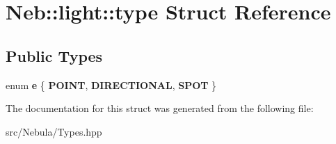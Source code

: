 \hypertarget{structNeb_1_1light_1_1type}{\section{\-Neb\-:\-:light\-:\-:type \-Struct \-Reference}
\label{structNeb_1_1light_1_1type}
}
\subsection*{\-Public \-Types}
\begin{DoxyCompactItemize}
\item 
enum {\bfseries e} \{ {\bfseries \-P\-O\-I\-N\-T}, 
{\bfseries \-D\-I\-R\-E\-C\-T\-I\-O\-N\-A\-L}, 
{\bfseries \-S\-P\-O\-T}
 \}
\end{DoxyCompactItemize}


\-The documentation for this struct was generated from the following file\-:\begin{DoxyCompactItemize}
\item 
src/\-Nebula/\-Types.\-hpp\end{DoxyCompactItemize}
